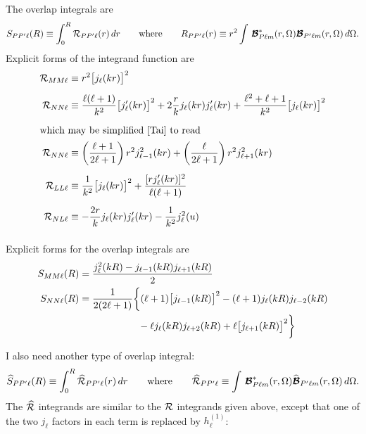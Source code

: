 \documentclass[letterpaper]{article}
\begin{document}
The overlap integrals are
$$
 S_{PP^\prime \ell}(R) \equiv \int_0^R \mathcal{R}_{PP^\prime \ell}(r)\, dr
\qquad\mbox{where}\qquad
R_{PP^\prime\ell}(r)\equiv r^2 \int\,
 \boldsymbol{\mathcal{B}}^*_{P\ell m}(r,\Omega)
 \boldsymbol{\mathcal{B}}_{P^\prime\ell m}(r,\Omega)\,d\Omega.
$$
Explicit forms of the integrand function are
\begin{align*}
\mathcal{R}_{MM\ell}&\equiv r^2 \big[j_\ell(kr)\big]^2 
\\[5pt]
\mathcal{R}_{NN\ell}&\equiv
  \frac{\ell(\ell+1)}{k^2} \big[j^\prime_\ell(kr)\big]^2 
 +2\frac{r}{k}j_\ell(kr) j_\ell^\prime(kr)
 +\frac{\ell^2+\ell+1}{k^2}\big[j_\ell(kr)\big]^2
\\[5pt]
\intertext{which may be simplified~\cite{Tai} to read}
\mathcal{R}_{NN\ell}&\equiv \left(\frac{\ell+1}{2\ell+1}\right)r^2 j_{\ell-1}^2(kr) 
                    + \left(\frac{\ell}{2\ell+1}\right)r^2 j_{\ell+1}^2(kr)
\\[5pt]
\mathcal{R}_{LL\ell}&\equiv 
  \frac{1}{k^2} \big[j_\ell(kr)\big]^2 
  + \frac{[rj_\ell^\prime(kr)]^2}{\ell(\ell+1)}
\\[5pt]
\mathcal{R}_{NL\ell}&\equiv 
  -\frac{2r}{k}j_\ell(kr)j^\prime_\ell(kr) - \frac{1}{k^2}j^2_\ell(u)
\\[5pt]
\end{align*}

Explicit forms for the overlap integrals are
\begin{subequations}
\begin{align}
 S_{MM\ell}(R)
&=\frac{j_\ell^2(kR) - j_{\ell-1}(kR) j_{\ell+1}(kR)}{2}
\\
 S_{NN\ell}(R)
&=\frac{1}{2(2\ell+1)}
  \bigg\{    (\ell+1)\big[j_{\ell-1}(kR)\big]^2 
           - (\ell+1)j_{\ell}(kR) j_{\ell-2}(kR)
\nonumber\\
&\qquad\qquad\qquad
           - \ell j_{\ell}(kR) j_{\ell+2}(kR)
           + \ell\big[j_{\ell+1}(kR)\big]^2
  \bigg\}
\end{align}
\label{ExplicitOverlapIntegrals}
\end{subequations}

I also need another type of overlap integral:
$$
 \widehat{S}_{PP^\prime \ell}(R) \equiv 
 \int_0^R \widehat{\mathcal{R}}_{PP^\prime \ell}(r)\, dr
\qquad\mbox{where}\qquad
\widehat{\mathcal{R}}_{PP^\prime\ell}\equiv \int\,
 \boldsymbol{\mathcal{B}}^*_{P\ell m}(r,\Omega)
 \widehat{\boldsymbol{\mathcal{B}}}_{P^\prime\ell m}(r,\Omega)\,d\Omega.
$$
The $\widehat{\mathcal{R}}$ integrands are similar to the $\mathcal{R}$ integrands
given above, except that one of the two $j_\ell$ factors in each 
term is replaced by $h_\ell^{(1)}$:
\end{document}
